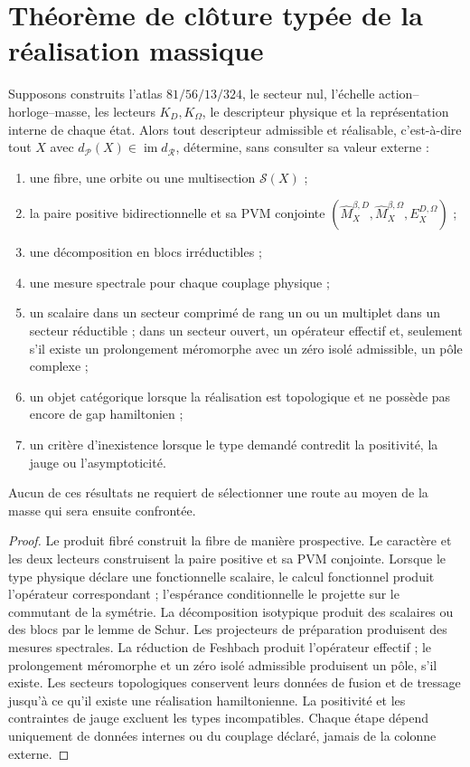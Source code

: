 \section{Théorème de clôture typée de la réalisation massique}

\begin{theorem}
Supposons construits l'atlas \(81/56/13/324\), le secteur nul, l'échelle
action--horloge--masse, les lecteurs \(K_D,K_\Omega\), le descripteur physique et la
représentation interne de chaque état. Alors tout descripteur admissible et
réalisable, c'est-à-dire tout \(X\) avec
\(d_{\mathcal P}(X)\in\operatorname{im}d_{\mathcal R}\),
détermine, sans consulter sa valeur externe :
\begin{enumerate}
\item une fibre, une orbite ou une multisection \(\mathscr S(X)\) ;
\item la paire positive bidirectionnelle et sa PVM conjointe
      \((\widehat M_X^{\beta,D},\widehat M_X^{\beta,\Omega},
      E_X^{D,\Omega})\) ;
\item une décomposition en blocs irréductibles ;
\item une mesure spectrale pour chaque couplage physique ;
\item un scalaire dans un secteur comprimé de rang un ou un multiplet dans un
      secteur réductible ; dans un secteur ouvert, un opérateur effectif et, seulement s'il
      existe un prolongement méromorphe avec un zéro isolé admissible, un pôle
      complexe ;
\item un objet catégorique lorsque la réalisation est topologique et ne possède pas encore
      de gap hamiltonien ;
\item un critère d'inexistence lorsque le type demandé contredit
      la positivité, la jauge ou l'asymptoticité.
\end{enumerate}
Aucun de ces résultats ne requiert de sélectionner une route au moyen de la masse
qui sera ensuite confrontée.
\end{theorem}

\begin{proof}
Le produit fibré construit la fibre de manière prospective. Le caractère et les
deux lecteurs construisent la paire positive et sa PVM conjointe. Lorsque le type
physique déclare une fonctionnelle scalaire, le calcul fonctionnel produit l'opérateur
correspondant ; l'espérance conditionnelle le projette sur le commutant de la
symétrie. La décomposition isotypique produit des scalaires ou des blocs par le lemme
de Schur. Les projecteurs de préparation produisent des mesures spectrales. La
réduction de Feshbach produit l'opérateur effectif ; le prolongement méromorphe
et un zéro isolé admissible produisent un pôle, s'il existe. Les secteurs
topologiques conservent leurs données de fusion et de tressage jusqu'à ce qu'il existe une
réalisation hamiltonienne. La positivité et les contraintes de jauge
excluent les types incompatibles. Chaque étape dépend uniquement de données internes ou
du couplage déclaré, jamais de la colonne externe.
\end{proof}

